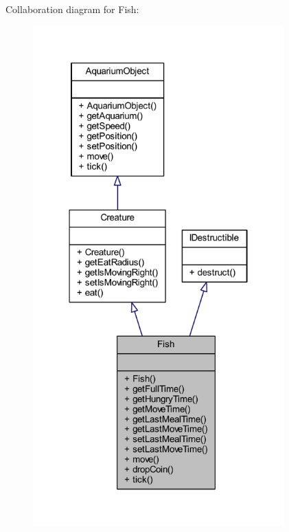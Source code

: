 Collaboration diagram for Fish\+:\nopagebreak
\begin{figure}[H]
\begin{center}
\leavevmode
\includegraphics[width=274pt]{class_fish__coll__graph}
\end{center}
\end{figure}
